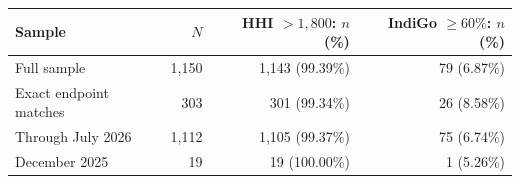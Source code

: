 \begin{tabular}{@{}lrrr@{}}
\toprule
Sample & $N$ & HHI $>1{,}800$: $n$ (\%) & IndiGo $\geq60\%$: $n$ (\%) \\
\midrule
Full sample & 1,150 & 1,143 (99.39\%) & 79 (6.87\%) \\
Exact endpoint matches & 303 & 301 (99.34\%) & 26 (8.58\%) \\
Through July 2026 & 1,112 & 1,105 (99.37\%) & 75 (6.74\%) \\
December 2025 & 19 & 19 (100.00\%) & 1 (5.26\%) \\
\bottomrule
\end{tabular}
